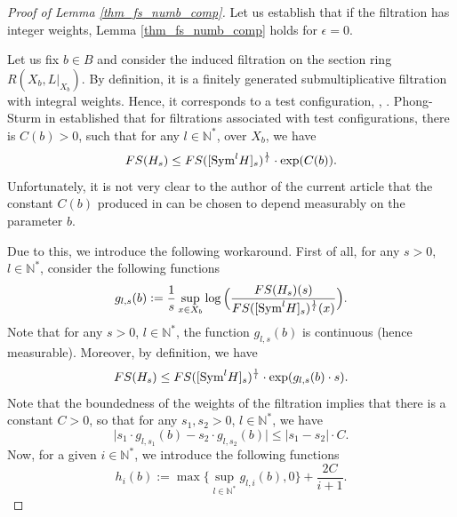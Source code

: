 \documentclass[12pt]{article}
\numberwithin{equation}{section}
\theoremstyle{theorem}
\theoremstyle{definition}
\theoremstyle{remark}
\newcommand{\nat}{\mathbb{N}}
\begin{document}
	\begin{proof}[Proof of Lemma \ref{thm_fs_numb_comp}]
		Let us establish that if the filtration has integer weights, Lemma \ref{thm_fs_numb_comp} holds for $\epsilon = 0$.
		\par 
		Let us fix $b \in B$ and consider the induced filtration on the section ring $R(X_b, L|_{X_b})$.
		By definition, it is a finitely generated submultiplicative filtration with integral weights.
		Hence, it corresponds to a test configuration, \cite{NystOkounTest}, \cite{SzekeTestConf}.
		Phong-Sturm in \cite[Lemma 4]{PhongSturmRegul} established that for filtrations associated with test configurations, there is $C(b) > 0$, such that for any $l \in \nat^*$, over $X_b$, we have
		\begin{equation}\label{eq_ps_stat_expl}
			FS(H_s)
			\leq 
			FS([{\rm{Sym}}^l H]_s)^{\frac{1}{l}}
			\cdot
			\exp(C(b)).
		\end{equation}
		Unfortunately, it is not very clear to the author of the current article that the constant $C(b)$ produced in \cite{PhongSturmRegul} can be chosen to depend measurably on the parameter $b$.
		\par 
		Due to this, we introduce the following workaround.
		First of all, for any $s > 0$, $l \in \nat^*$, consider the following functions
		\begin{equation}
			g_{l, s}(b) := \frac{1}{s} \sup_{x \in X_b} \log \Big( \frac{FS(H_s)(s)}{FS([{\rm{Sym}}^l H]_s)^{\frac{1}{l}}(x)} \Big).
		\end{equation}
		Note that for any $s > 0$, $l \in \nat^*$, the function $g_{l, s}(b)$ is continuous (hence measurable).
		Moreover, by definition, we have
		\begin{equation}\label{eq_fs_bnd_triv_000}
			FS(H_s)
			\leq 
			FS([{\rm{Sym}}^l H]_s)^{\frac{1}{l}}
			\cdot
			\exp(g_{l, s}(b) \cdot s).
		\end{equation}
		Note that the boundedness of the weights of the filtration implies that there is a constant $C > 0$, so that for any $s_1, s_2 > 0$, $l \in \nat^*$, we have
		\begin{equation}\label{eq_fs_bnd_triv_111}
			\big| s_1 \cdot g_{l, s_1}(b) - s_2 \cdot g_{l, s_2}(b) \big| \leq |s_1 - s_2| \cdot C.
		\end{equation}
		Now, for a given $i \in \nat^*$, we introduce the following functions
		\begin{equation}
			h_i(b) := \max\Big\{ \sup_{l \in \nat^*} g_{l, i}(b), 0 \Big\} + \frac{2 C}{i + 1}.
		\end{equation}

\end{proof}
\end{document}
